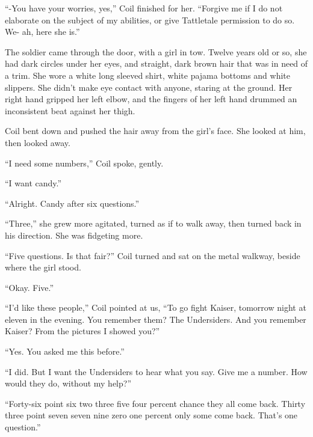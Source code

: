 ``-You have your worries, yes,'' Coil finished for her.  ``Forgive me if I do not elaborate on the subject of my abilities, or give Tattletale permission to do so.  We- ah, here she is.''



The soldier came through the door, with a girl in tow.  Twelve years old or so, she had dark circles under her eyes, and straight, dark brown hair that was in need of a trim.  She wore a white long sleeved shirt, white pajama bottoms and white slippers.  She didn't make eye contact with anyone, staring at the ground.  Her right hand gripped her left elbow, and the fingers of her left hand drummed an inconsistent beat against her thigh.



Coil bent down and pushed the hair away from the girl's face.  She looked at him, then looked away.



``I need some numbers,'' Coil spoke, gently.



``I want candy.''



``Alright.  Candy after six questions.''



``Three,'' she grew more agitated, turned as if to walk away, then turned back in his direction.  She was fidgeting more.



``Five questions.  Is that fair?''  Coil turned and sat on the metal walkway, beside where the girl stood.



``Okay.  Five.''



``I'd like these people,'' Coil pointed at us, ``To go fight Kaiser, tomorrow night at eleven in the evening.  You remember them?  The Undersiders.  And you remember Kaiser?  From the pictures I showed you?''



``Yes.  You asked me this before.''



``I did.  But I want the Undersiders to hear what you say.  Give me a number.  How would they do, without my help?''



``Forty-six point six two three five four percent chance they all come back.  Thirty three point seven seven nine zero one percent only some come back.  That's one question.''



